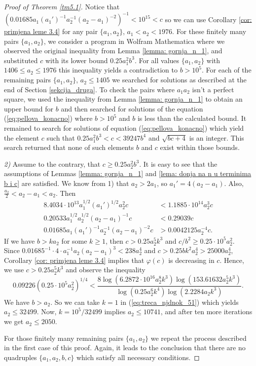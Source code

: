 \documentclass[12pt]{amsart}%
\theoremstyle{definition}
\theoremstyle{remark}
\theoremstyle{plain}
\begin{document}
\begin{proof}[Proof of Theorem \ref{tm5.1}]
Notice that $(0.01685a_1(a_1')^{-1}a_2^{-1}(a_2-a_1)^{-2})^{-1}<10^{15}<c$ so we can use Corollary \ref{cor: primjena leme 3.4} for any pair $\{a_1,a_2\}$, $a_1<a_2<1976$. For these finitely many pairs $\{a_1,a_2\}$, 
we consider a program in Wolfram Mathematica where we observed the original inequality from Lemma \ref{lemma: gornja_n_1}, and substituted $c$ with its lower bound $0.25a_1^2b^3$. 
For all values $\{a_1,a_2\}$ with $1406\leq a_2\leq 1976$ this inequality yields a contradiction to $b>10^5.$
For each of the remaining pairs $\{a_1,a_2\}$, $a_2\leq 1405$ we searched for solutions as described at the end of Section \ref{sekcija_druga}.
To check the pairs where $a_1a_2$ isn't a perfect square, we used the inequality from Lemma \ref{lemma: gornja_n_1} to obtain an upper bound for $b$ and then searched for solutions of the equation (\ref{eq:pellova_konacno}) where $b > 10^5$ and $b$ is less than the calculated bound. It remained to search for solutions of equation (\ref{eq:pellova_konacno}) which yield the element $c$ such that $0.25a_1^2b^3< c< 39247b^4$ and $\sqrt{bc+4}$ is an integer. This search returned that none of such elements $b$ and $c$ exist within those bounds.

\medskip 
\emph{2)} Assume to the contrary, that $c\geq 0.25a_2^2b^3$. It is easy to see that the assumptions of Lemmas \ref{lemma: gornja_n_1} and \ref{lema: donja na n u terminima b i c} are satisfied.
We know from 1) that $a_2>2a_1$, so $a_1'=4(a_2-a_1).$ Also, $\frac{a_2}{2}<a_2-a_1<a_2$. Then 
\begin{align*}
 8.4034\cdot 10^{13}a_1^{1/2}(a_1')^{1/2}a_2^2c&<1.1885\cdot 10^{14}a_2^3c\\
 0.20533a_1^{1/2}a_2^{1/2}(a_2-a_1)^{-1}c&<0.29039c\\
 0.01685a_1(a_1')^{-1}a_2^{-1}(a_2-a_1)^{-2}c&>0.0042125a_2^{-4}c.
\end{align*}
If we have $b> ka_2$ for some $k\geq 1$, then $c>0.25a_2^5k^3$ and $c/b^2\geq 0.25\cdot 10^5a_2^2$. Since $0.01685^{-1}\cdot 4\cdot a_1^{-1} a_2(a_2-a_1)^3<238a_2^4$ and $c>0.25bk^2a_2^4>25000a_2^4$, Corollary \ref{cor: primjena leme 3.4} implies that $\varphi(c)$ is decreasing in $c$. Hence, we use $c>0.25a_2^5k^3$ and observe the inequality 
\begin{equation}\label{eq:treca_njdnok_51}
    0.09226(0.25\cdot 10^5a_2^2)^{1/4}<\frac{8\log(6.2872\cdot 10^{16}a_2^8k^3)\log(153.61632a_2^5k^3)}{\log(0.25a_2^6k^4)\log(2.2284 a_2k^3)}.
\end{equation}
We have $b>a_2$.  So we can take $k=1$ in (\ref{eq:treca_njdnok_51}) which yields $a_2\leq 32499$. 
Now, $k=10^5/32499$ implies $a_2\leq 10741$, and after ten more iterations we get $a_2 \leq 2050$.

For those finitely many remaining pairs $\{a_1,a_2\}$ we repeat the process described in the first case of this proof. Again, it leads to the conclusion that there are no quadruples $\{a_1,a_2,b,c\}$ which satisfy all necessary conditions.\hfill\qedhere

\end{proof}
\end{document}
